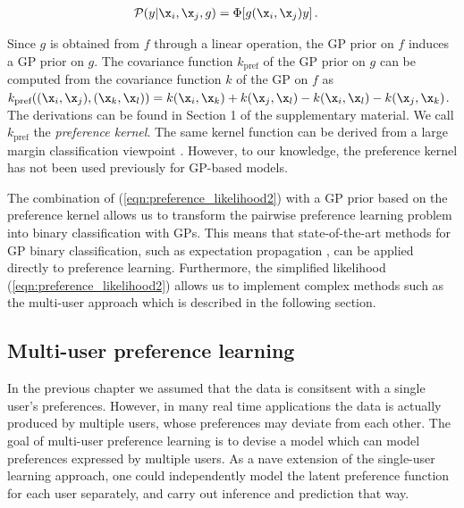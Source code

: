 \begin{align}
\mathcal{P}(y|\x_i,\x_j,g) &= \Phi[g(\x_i, \x_j)y]\,.\label{eqn:preference_likelihood2}
\end{align}

Since $g$ is obtained from $f$ through a linear operation, the GP prior on $f$ induces a GP prior on $g$.
The covariance function $k_\text{pref}$ of the GP prior on $g$ can be computed from the covariance function $k$ of the GP on $f$ as $k_\text{pref}((\x_i,\x_j),(\x_k,\x_l)) = k(\x_i,\x_k) + k(\x_j,\x_l) - k(\x_i,\x_l) - k(\x_j,\x_k)$. The derivations can be found in Section 1 of the supplementary material. We call $k_\text{pref}$ the \emph{preference kernel}. The same kernel function can be derived from a large margin classification viewpoint \citep{Furnkranz2010}. However, to our knowledge, the preference kernel has not been used previously for GP-based models.	

The combination of (\ref{eqn:preference_likelihood2}) with a GP prior based on the preference kernel allows us to transform the pairwise preference learning problem into  binary classification with GPs. This means that state-of-the-art methods for GP binary classification, such as expectation propagation \citep{Minka2001}, can be applied directly to preference learning. Furthermore, the simplified likelihood (\ref{eqn:preference_likelihood2}) allows us to implement complex methods such as the multi-user approach which is described in the following section.


\subsection{Multi-user preference learning}

In the previous chapter we assumed that the data is consitsent with a single user's preferences. However, in many real time applications the data is actually produced by multiple users, whose preferences may deviate from each other. The goal of multi-user preference learning is to devise a model which can model preferences expressed by multiple users. As a nave extension of the single-user learning approach, one could independently model the latent preference function  for each user separately, and carry out inference and prediction that way. 

